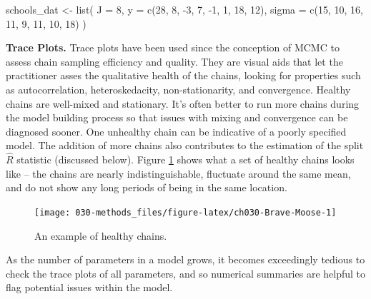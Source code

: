 \documentclass[11pt, oneside, openany]{scrbook}
\newenvironment{Shaded}{\begin{snugshade}}{\end{snugshade}}
\newcommand{\AttributeTok}[1]{\textcolor[rgb]{0.77,0.63,0.00}{#1}}
\newcommand{\DecValTok}[1]{\textcolor[rgb]{0.00,0.00,0.81}{#1}}
\newcommand{\FunctionTok}[1]{\textcolor[rgb]{0.00,0.00,0.00}{#1}}
\newcommand{\NormalTok}[1]{#1}
\newcommand{\OtherTok}[1]{\textcolor[rgb]{0.56,0.35,0.01}{#1}}
\newcommand{\SpecialCharTok}[1]{\textcolor[rgb]{0.00,0.00,0.00}{#1}}
\begin{document}
\begin{Shaded}
\begin{Highlighting}[]
\NormalTok{schools\_dat }\OtherTok{\textless{}{-}} \FunctionTok{list}\NormalTok{(}
  \AttributeTok{J =} \DecValTok{8}\NormalTok{,}
  \AttributeTok{y =} \FunctionTok{c}\NormalTok{(}\DecValTok{28}\NormalTok{,  }\DecValTok{8}\NormalTok{, }\SpecialCharTok{{-}}\DecValTok{3}\NormalTok{,  }\DecValTok{7}\NormalTok{, }\SpecialCharTok{{-}}\DecValTok{1}\NormalTok{,  }\DecValTok{1}\NormalTok{, }\DecValTok{18}\NormalTok{, }\DecValTok{12}\NormalTok{),}
  \AttributeTok{sigma =} \FunctionTok{c}\NormalTok{(}\DecValTok{15}\NormalTok{, }\DecValTok{10}\NormalTok{, }\DecValTok{16}\NormalTok{, }\DecValTok{11}\NormalTok{,  }\DecValTok{9}\NormalTok{, }\DecValTok{11}\NormalTok{, }\DecValTok{10}\NormalTok{, }\DecValTok{18}\NormalTok{)}
\NormalTok{)}
\end{Highlighting}
\end{Shaded}

\textbf{Trace Plots.} Trace plots have been used since the conception of MCMC to assess chain sampling efficiency and quality. They are visual aids that let the practitioner asses the qualitative health of the chains, looking for properties such as autocorrelation, heteroskedacity, non-stationarity, and convergence. Healthy chains are well-mixed and stationary. It's often better to run more chains during the model building process so that issues with mixing and convergence can be diagnosed sooner. One unhealthy chain can be indicative of a poorly specified model. The addition of more chains also contributes to the estimation of the split \(\hat{R}\) statistic (discussed below). Figure \ref{fig:ch030-Brave-Moose} shows what a set of healthy chains looks like -- the chains are nearly indistinguishable, fluctuate around the same mean, and do not show any long periods of being in the same location.

\begin{figure}

{\centering \texttt{[image: 030-methods\_files/figure-latex/ch030-Brave-Moose-1]} 

}

\caption{An example of healthy chains.}\label{fig:ch030-Brave-Moose}
\end{figure}

As the number of parameters in a model grows, it becomes exceedingly tedious to check the trace plots of all parameters, and so numerical summaries are helpful to flag potential issues within the model.
\end{document}
